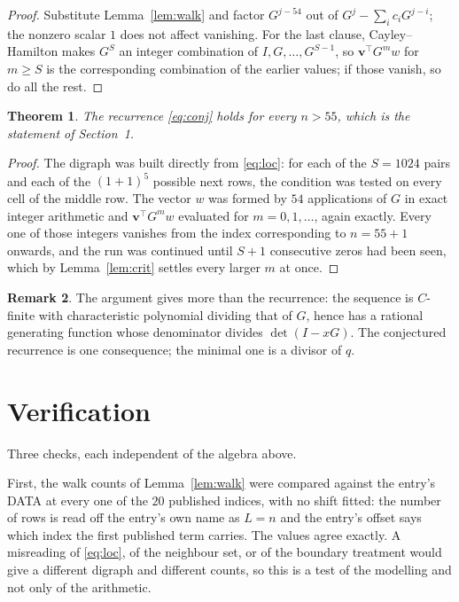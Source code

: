 \documentclass[11pt,a4paper]{article}
\theoremstyle{plain}
\newtheorem{theorem}{Theorem}
\theoremstyle{definition}
\newtheorem{remark}[theorem]{Remark}
\begin{document}
\begin{proof}
Substitute Lemma~\ref{lem:walk} and factor $G^{j-54}$ out of
$G^{j}-\sum_ic_iG^{j-i}$; the nonzero scalar $1$ does not affect
vanishing. For the last clause, Cayley--Hamilton makes $G^{S}$ an integer combination of
$I,G,\dots,G^{S-1}$, so $\mathbf{v}^{\!\top}G^{m}w$ for $m\ge S$ is the corresponding
combination of the earlier values; if those vanish, so do all the rest.
\end{proof}

\begin{theorem}
The recurrence \eqref{eq:conj} holds for every $n>55$, which is the statement of
Section~1.
\end{theorem}

\begin{proof}
The digraph was built directly from \eqref{eq:loc}: for each of the $S=1024$ pairs and each
of the $(1+1)^{5}$ possible next rows, the condition was tested on every cell of
the middle row. The vector $w$ was formed by $54$ applications of $G$ in exact integer
arithmetic and $\mathbf{v}^{\!\top}G^{m}w$ evaluated for $m=0,1,\dots$, again exactly.
Every one of those integers vanishes from the index corresponding to $n=55+1$ onwards,
and the run was continued until $S+1$ consecutive zeros had been seen, which by
Lemma~\ref{lem:crit} settles every larger $m$ at once.
\end{proof}

\begin{remark}
The argument gives more than the recurrence: the sequence is $C$-finite with characteristic
polynomial dividing that of $G$, hence has a rational generating function whose denominator
divides $\det(I-xG)$. The conjectured recurrence is one consequence; the minimal one is a
divisor of $q$.
\end{remark}

\section{Verification}

Three checks, each independent of the algebra above.

First, the walk counts of Lemma~\ref{lem:walk} were compared against the entry's DATA at
every one of the $20$ published indices, with no shift fitted: the number of rows is
read off the entry's own name as $L=n$ and the entry's offset says which index the first
published term carries. The values agree exactly. A misreading of \eqref{eq:loc}, of the
neighbour set, or of the boundary treatment would give a different digraph and different
counts, so this is a test of the modelling and not only of the arithmetic.
\end{document}
